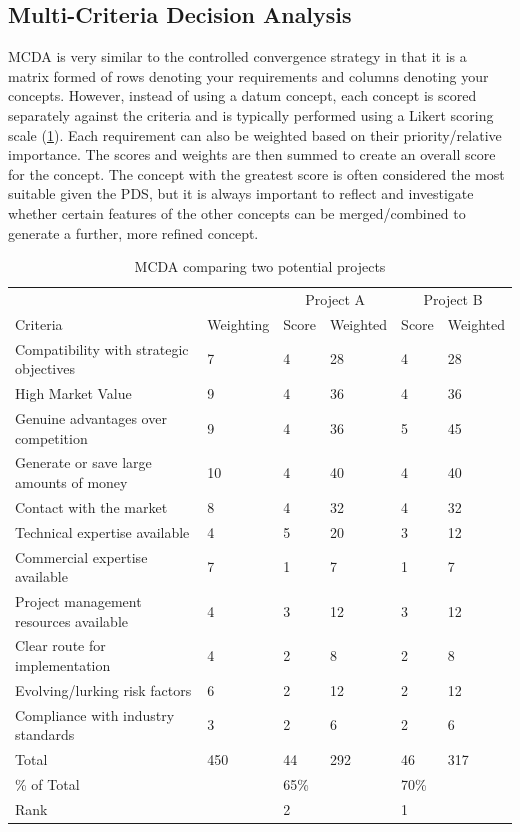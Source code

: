 \subsection{Multi-Criteria Decision Analysis}

\acf{MCDA} is very similar to the controlled convergence strategy in that it is a matrix formed of rows denoting your requirements and columns denoting your concepts. However, instead of using a datum concept, each concept is scored separately against the criteria and is typically performed using a Likert scoring scale (\cref{tbl-mcda}). Each requirement can also be weighted based on their priority/relative importance. The scores and weights are then summed to create an overall score for the concept. The concept with the greatest score is often considered the most suitable given the \ac{PDS}, but it is always important to reflect and investigate whether certain features of the other concepts can be merged/combined to generate a further, more refined concept.

\begin{table}[h!]
\centering
\caption{MCDA comparing two potential projects}\label{tbl-mcda}
\begin{tabular}{l l l l l l}
\toprule
& & \multicolumn{2}{c}{Project A} & \multicolumn{2}{c}{Project B} \\
Criteria & Weighting & Score & Weighted & Score & Weighted \\
\midrule
Compatibility with strategic objectives & 7
& 4
& 28
& 4
& 28 \\
High Market Value
& 9
& 4
& 36
& 4
& 36 \\
Genuine advantages over competition
& 9
& 4
& 36
& 5
& 45 \\
Generate or save large amounts of money
& 10
& 4
& 40
& 4
& 40 \\
Contact with the market
& 8
& 4
& 32
& 4
& 32 \\
Technical expertise available
& 4
& 5
& 20
& 3
& 12 \\
Commercial expertise available
& 7
& 1
& 7
& 1
& 7 \\
Project management resources available
& 4
& 3
& 12
& 3
& 12\\
Clear route for implementation
& 4
& 2
& 8
& 2
& 8 \\
Evolving/lurking risk factors
& 6
& 2
& 12
& 2
& 12 \\
Compliance with industry standards
& 3
& 2
& 6
& 2
& 6 \\
Total 
& 450
& 44
& 292
& 46
& 317 \\
\midrule
\% of Total & & 65\% & & 70\% \\
Rank & & 2 & & 1 \\
\bottomrule
\end{tabular}
\vspace{1em}
\end{table}

